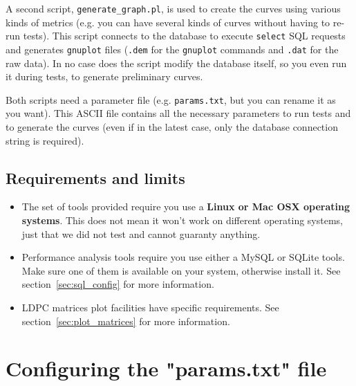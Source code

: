 \documentclass[a4paper,11pt]{article}
\begin{document}
{A second script, \verb+generate_graph.pl+, is used to create the curves using various kinds of
metrics (e.g. you can have several kinds of curves without having to re-run tests).
This script connects to the database to execute \verb+select+ SQL requests and generates
\verb+gnuplot+ files (\verb+.dem+ for the \verb+gnuplot+ commands and \verb+.dat+ for the raw data).
In no case does the script modify the database itself, so you even run it during tests, to
generate preliminary curves.

Both scripts need a parameter file (e.g. \verb+params.txt+, but you can rename it as you want).
This ASCII file contains all the necessary parameters to run tests and to generate the curves
(even if in the latest case, only the database connection string is required).


\subsection{Requirements and limits}

\begin{itemize}
\item
The set of tools provided require you use a {\bf Linux or Mac OSX operating systems}.
This does not mean it won't work on different operating systems, just that we did not
test and cannot guaranty anything.
\item
Performance analysis tools require you use either a MySQL or SQLite tools. Make
sure one of them is available on your system, otherwise install it.
See section~\ref{sec:sql_config} for more information.
\item
LDPC matrices plot facilities have specific requirements. 
See section~\ref{sec:plot_matrices} for more information.
\end{itemize}




\section{Configuring the "params.txt" file}
\label{sec:params_file}
\begin{flushright}
\end{flushright}

}
\end{document}
